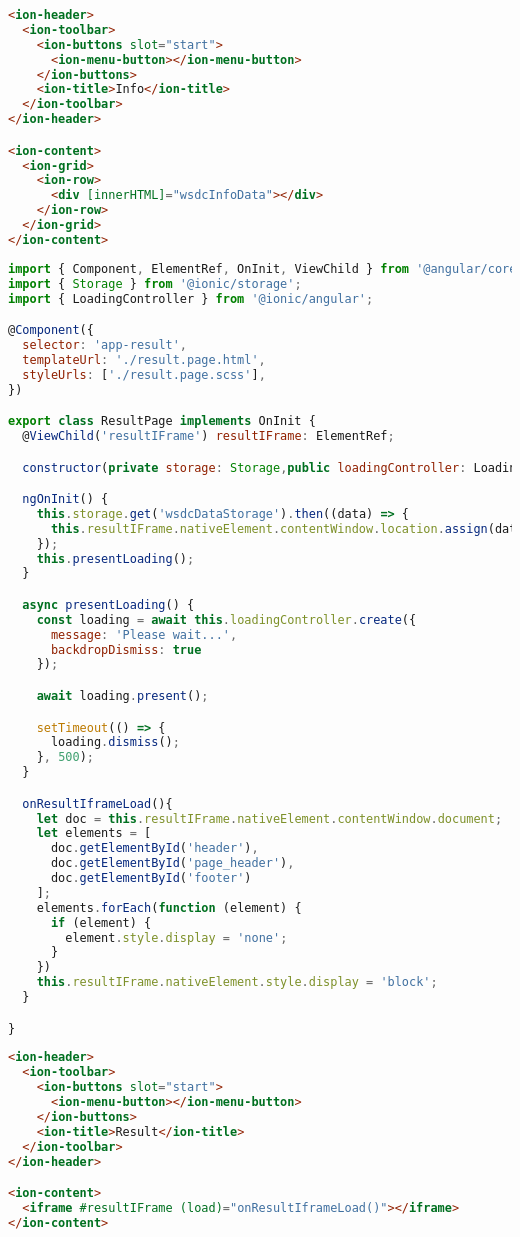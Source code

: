\begin{lstlisting}[language=html, label={lst:info.page.html}, caption=info.page.html]
<ion-header>
  <ion-toolbar>
    <ion-buttons slot="start">
      <ion-menu-button></ion-menu-button>
    </ion-buttons>
    <ion-title>Info</ion-title>
  </ion-toolbar>
</ion-header>

<ion-content>
  <ion-grid>
    <ion-row>
      <div [innerHTML]="wsdcInfoData"></div>
    </ion-row>
  </ion-grid>
</ion-content>

\end{lstlisting}

\begin{lstlisting}[language=JavaScript, label={lst:result.page.ts}, caption=result.page.ts]
import { Component, ElementRef, OnInit, ViewChild } from '@angular/core';
import { Storage } from '@ionic/storage';
import { LoadingController } from '@ionic/angular';

@Component({
  selector: 'app-result',
  templateUrl: './result.page.html',
  styleUrls: ['./result.page.scss'],
})

export class ResultPage implements OnInit {
  @ViewChild('resultIFrame') resultIFrame: ElementRef;

  constructor(private storage: Storage,public loadingController: LoadingController) { }

  ngOnInit() {
    this.storage.get('wsdcDataStorage').then((data) => {
      this.resultIFrame.nativeElement.contentWindow.location.assign(data.results);
    });
    this.presentLoading();
  }

  async presentLoading() {
    const loading = await this.loadingController.create({
      message: 'Please wait...',
      backdropDismiss: true
    });

    await loading.present();

    setTimeout(() => {
      loading.dismiss();
    }, 500);
  }

  onResultIframeLoad(){
    let doc = this.resultIFrame.nativeElement.contentWindow.document;
    let elements = [
      doc.getElementById('header'),
      doc.getElementById('page_header'),
      doc.getElementById('footer')
    ];
    elements.forEach(function (element) {
      if (element) {
        element.style.display = 'none';
      }
    })
    this.resultIFrame.nativeElement.style.display = 'block';
  }

}

\end{lstlisting} 

\begin{lstlisting}[language=html, label={lst:result.page.html}, caption=result.page.html]
<ion-header>
  <ion-toolbar>
    <ion-buttons slot="start">
      <ion-menu-button></ion-menu-button>
    </ion-buttons>
    <ion-title>Result</ion-title>
  </ion-toolbar>
</ion-header>

<ion-content>
  <iframe #resultIFrame (load)="onResultIframeLoad()"></iframe>
</ion-content>

\end{lstlisting}

